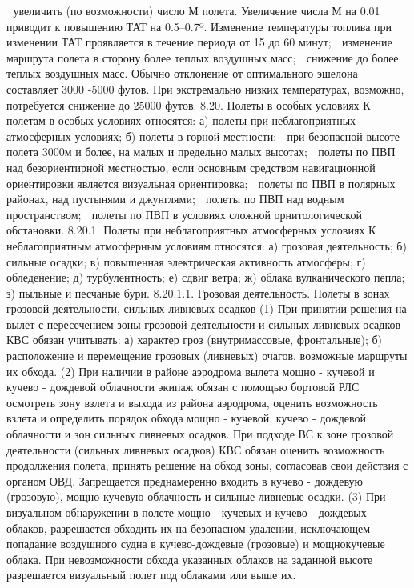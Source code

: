 	увеличить (по возможности) число М полета. Увеличение числа М на 0.01 приводит к повышению ТАТ на 0.5–0.7º. Изменение температуры топлива при изменении ТАТ проявляется в течение периода от 15 до 60 минут;
	изменение маршрута полета в сторону более теплых воздушных масс;
	снижение до более теплых воздушных масс. Обычно отклонение от оптимального эшелона составляет 3000 -5000 футов. При экстремально низких температурах, возможно, потребуется снижение до 25000 футов.
8.20.	Полеты в особых условиях 
К полетам в особых условиях относятся:
а)	полеты при неблагоприятных атмосферных условиях;
б)	полеты в горной местности:
	при безопасной высоте полета 3000м и более, на малых и предельно малых высотах;
	полеты по ПВП над безориентирной местностью, если основным средством навигационной ориентировки является визуальная ориентировка;
	полеты по ПВП в полярных районах, над пустынями и джунглями;
	полеты по ПВП над водным пространством;
	полеты по ПВП в условиях сложной орнитологической обстановки.
8.20.1.	Полеты при неблагоприятных атмосферных условиях
К неблагоприятным атмосферным условиям относятся:
а)	грозовая деятельность;
б)	сильные осадки;
в)	повышенная электрическая активность атмосферы;
г)	обледенение;
д)	турбулентность;
е)	сдвиг ветра;
ж)	облака вулканического пепла;
з)	пыльные и песчаные бури.
8.20.1.1.	Грозовая деятельность. Полеты в зонах грозовой деятельности, сильных ливневых осадков
(1) При принятии решения на вылет с пересечением зоны грозовой деятельности и сильных ливневых осадков КВС обязан учитывать:
а)	характер гроз (внутримассовые, фронтальные);
б)	расположение и перемещение грозовых (ливневых) очагов, возможные маршруты их обхода.
(2) При наличии в районе аэродрома вылета мощно - кучевой и кучево - дождевой облачности экипаж обязан с помощью бортовой РЛС осмотреть зону взлета и выхода из района аэродрома, оценить возможность взлета и определить порядок обхода мощно - кучевой, кучево - дождевой облачности и зон сильных ливневых осадков.
При подходе ВС к зоне грозовой деятельности (сильных ливневых осадков) КВС обязан оценить возможность продолжения полета, принять решение на обход зоны, согласовав свои действия с органом ОВД.
Запрещается преднамеренно входить в кучево - дождевую (грозовую), мощно-кучевую облачность и сильные ливневые осадки.
(3) При визуальном обнаружении в полете мощно - кучевых и кучево - дождевых облаков, разрешается обходить их на безопасном удалении, исключающем попадание воздушного судна в кучево-дождевые (грозовые) и мощнокучевые облака. При невозможности обхода указанных облаков на заданной высоте разрешается визуальный полет под облаками или выше их.
